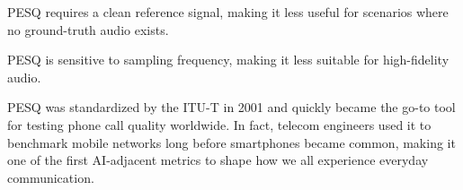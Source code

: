 {
\item PESQ requires a clean reference signal, making it less useful for scenarios where no ground-truth audio exists.
\item PESQ is sensitive to sampling frequency, making it less suitable for high-fidelity audio.
}

\clearpage

\thispagestyle{customstyle}

{PESQ was standardized by the ITU-T in 2001 and quickly became the go-to tool for testing phone call quality worldwide. 
In fact, telecom engineers used it to benchmark mobile networks long before smartphones became common, making it one of the
first AI-adjacent metrics to shape how we all experience everyday communication.}